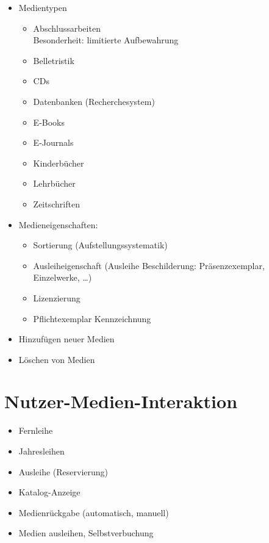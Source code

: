 \begin{itemize}
\item Medientypen
\begin{itemize}
\item Abschlussarbeiten\\
Besonderheit: limitierte Aufbewahrung
\item Belletristik
\item CDs
\item Datenbanken (Recherchesystem)
\item E-Books
\item E-Journals
\item Kinderbücher
\item Lehrbücher
\item Zeitschriften
\end{itemize}
\item Medieneigenschaften:
\begin{itemize}
\item Sortierung (Aufstellungssystematik)
\item Ausleiheigenschaft (Ausleihe Beschilderung: Präsenzexemplar, Einzelwerke, …)
\item Lizenzierung
\item Pflichtexemplar Kennzeichnung
\end{itemize}
\item Hinzufügen neuer Medien
\item Löschen von Medien
\end{itemize}

\section{Nutzer-Medien-Interaktion}
\begin{itemize}
\item Fernleihe
\item Jahresleihen
\item Ausleihe (Reservierung)
\item Katalog-Anzeige
\item Medienrückgabe (automatisch, manuell)
\item Medien ausleihen, Selbstverbuchung
\end{itemize}

